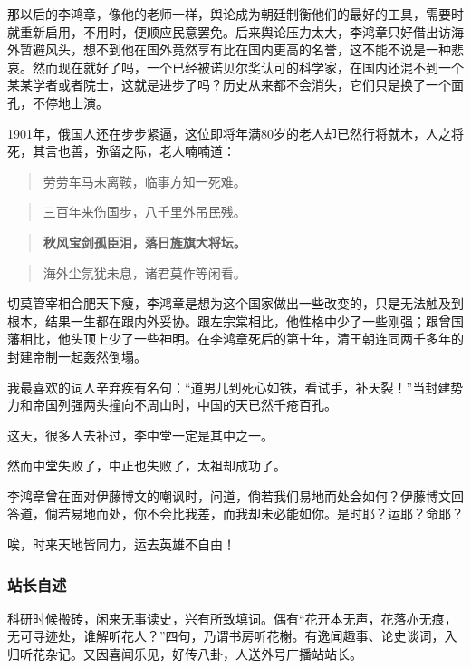 \documentclass[]{book}
\begin{document}
那以后的李鸿章，像他的老师一样，舆论成为朝廷制衡他们的最好的工具，需要时就重新启用，不用时，便顺应民意罢免。后来舆论压力太大，李鸿章只好借出访海外暂避风头，想不到他在国外竟然享有比在国内更高的名誉，这不能不说是一种悲哀。然而现在就好了吗，一个已经被诺贝尔奖认可的科学家，在国内还混不到一个某某学者或者院士，这就是进步了吗？历史从来都不会消失，它们只是换了一个面孔，不停地上演。

1901年，俄国人还在步步紧逼，这位即将年满80岁的老人却已然行将就木，人之将死，其言也善，弥留之际，老人喃喃道：

\begin{quote}
劳劳车马未离鞍，临事方知一死难。
\end{quote}

\begin{quote}
三百年来伤国步，八千里外吊民残。
\end{quote}

\begin{quote}
\textbf{秋风宝剑孤臣泪，落日旌旗大将坛。}
\end{quote}

\begin{quote}
海外尘氛犹未息，诸君莫作等闲看。
\end{quote}

切莫管宰相合肥天下瘦，李鸿章是想为这个国家做出一些改变的，只是无法触及到根本，结果一生都在跟内外妥协。跟左宗棠相比，他性格中少了一些刚强；跟曾国藩相比，他头顶上少了一些神明。在李鸿章死后的第十年，清王朝连同两千多年的封建帝制一起轰然倒塌。

我最喜欢的词人辛弃疾有名句：``道男儿到死心如铁，看试手，补天裂！''当封建势力和帝国列强两头撞向不周山时，中国的天已然千疮百孔。

这天，很多人去补过，李中堂一定是其中之一。

然而中堂失败了，中正也失败了，太祖却成功了。

李鸿章曾在面对伊藤博文的嘲讽时，问道，倘若我们易地而处会如何？伊藤博文回答道，倘若易地而处，你不会比我差，而我却未必能如你。是时耶？运耶？命耶？

唉，时来天地皆同力，运去英雄不自由！

\subsubsection*{站长自述}

科研时候搬砖，闲来无事读史，兴有所致填词。偶有``花开本无声，花落亦无痕，无可寻迹处，谁解听花人？''四句，乃谓书房听花榭。有逸闻趣事、论史谈词，入归听花杂记。又因喜闻乐见，好传八卦，人送外号广播站站长。
\end{document}
